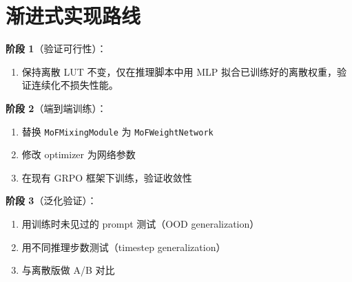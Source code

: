 \documentclass[11pt,a4paper]{article}
\theoremstyle{definition}
\begin{document}
\section{渐进式实现路线}

\textbf{阶段 1}（验证可行性）：
\begin{enumerate}
    \item 保持离散 LUT 不变，仅在推理脚本中用 MLP 拟合已训练好的离散权重，验证连续化不损失性能。
\end{enumerate}

\textbf{阶段 2}（端到端训练）：
\begin{enumerate}
    \item 替换 \texttt{MoFMixingModule} 为 \texttt{MoFWeightNetwork}
    \item 修改 optimizer 为网络参数
    \item 在现有 GRPO 框架下训练，验证收敛性
\end{enumerate}

\textbf{阶段 3}（泛化验证）：
\begin{enumerate}
    \item 用训练时未见过的 prompt 测试（OOD generalization）
    \item 用不同推理步数测试（timestep generalization）
    \item 与离散版做 A/B 对比
\end{enumerate}
\end{document}
